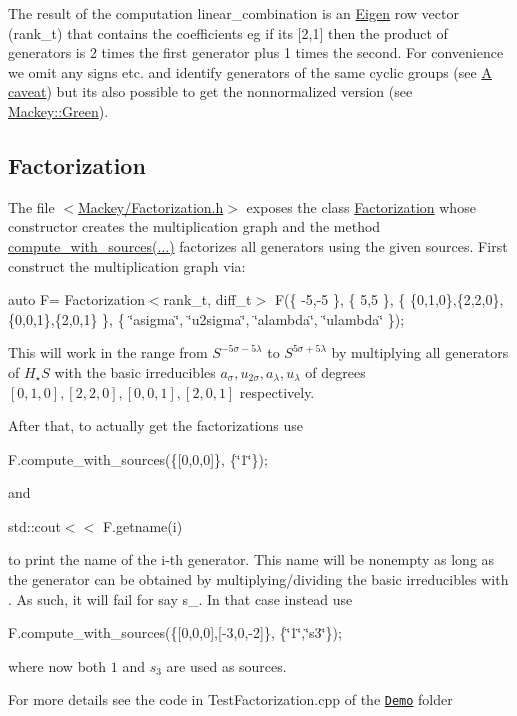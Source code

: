 The result of the computation {\ttfamily linear\+\_\+combination} is an \hyperlink{namespaceEigen}{Eigen} row vector ({\ttfamily rank\+\_\+t}) that contains the coefficients eg if it\textquotesingle{}s {\ttfamily \mbox{[}2,1\mbox{]}} then the product of generators is 2 times the first generator plus 1 times the second. For convenience we omit any signs etc. and identify generators of the same cyclic groups (see \hyperlink{math_caveat}{A caveat}) but it\textquotesingle{}s also possible to get the nonnormalized version (see \hyperlink{classMackey_1_1Green}{Mackey\+::\+Green}).\hypertarget{use_step1fact}{}\subsection{Factorization}\label{use_step1fact}
The file {\ttfamily $<$\hyperlink{Factorization_8h}{Mackey/\+Factorization.\+h}$>$} exposes the class \hyperlink{classMackey_1_1Factorization}{Factorization} whose constructor creates the multiplication graph and the method \hyperlink{classMackey_1_1Factorization_a2e135a37687fc3d69cd16a8729dd19eb}{compute\+\_\+with\+\_\+sources(...)} factorizes all generators using the given sources. First construct the multiplication graph via\+:

{\ttfamily auto F= Factorization$<$rank\+\_\+t, diff\+\_\+t$>$ F(\{ -\/5,-\/5 \}, \{ 5,5 \}, \{ \{0,1,0\},\{2,2,0\},\{0,0,1\},\{2,0,1\} \}, \{ \char`\"{}asigma\char`\"{}, \char`\"{}u2sigma\char`\"{}, \char`\"{}alambda\char`\"{}, \char`\"{}ulambda\char`\"{} \});}

This will work in the range from $S^{-5\sigma-5\lambda}$ to $S^{5\sigma+5\lambda}$ by multiplying all generators of $H_{\star}S$ with the basic irreducibles $ a_{\sigma}, u_{2\sigma}, a_{\lambda}, u_{\lambda}$ of degrees $[0,1,0],[2,2,0],[0,0,1],[2,0,1]$ respectively.

After that, to actually get the factorizations use

{\ttfamily F.\+compute\+\_\+with\+\_\+sources(\{\mbox{[}0,0,0\mbox{]}\}, \{\char`\"{}1\char`\"{}\});}

and

{\ttfamily std\+::cout$<$$<$ F.\+getname(i) }

to print the name of the {\ttfamily i}-\/th generator. This name will be nonempty as long as the generator can be obtained by multiplying/dividing the basic irreducibles with {}. As such, it will fail for say {\ttfamily s\+\_}. In that case instead use

{\ttfamily F.\+compute\+\_\+with\+\_\+sources(\{\mbox{[}0,0,0\mbox{]},\mbox{[}-\/3,0,-\/2\mbox{]}\}, \{\char`\"{}1\char`\"{},\char`\"{}s3\char`\"{}\});}

where now both $1$ and $s_3$ are used as sources.

For more details see the code in Test\+Factorization.\+cpp of the \href{https://github.com/NickG-Math/Mackey/tree/master/Demo}{\tt Demo} folder 